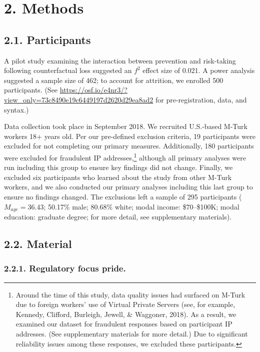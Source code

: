 \documentclass[man,floatsintext]{apa6}
\let\rmarkdownfootnote\footnote%
\def\footnote{\protect\rmarkdownfootnote}
\begin{document}
\hypertarget{methods}{%
\section{2. Methods}\label{methods}}

\hypertarget{participants}{%
\subsection{2.1. Participants}\label{participants}}

A pilot study examining the interaction between prevention and risk-taking following counterfactual loss suggested an \(f^2\) effect size of 0.021. A power analysis suggested a sample size of 462; to account for attrition, we enrolled 500 participants. (See \url{https://osf.io/e4nr3/?view_only=73c8490e19c6449197d2620d29ea8ad2} for pre-registration, data, and syntax.)

Data collection took place in September 2018. We recruited U.S.-based M-Turk workers 18+ years old. Per our pre-defined exclusion criteria, 19 participants were excluded for not completing our primary measures. Additionally, 180 participants were excluded for fraudulent IP addresses,\footnote{Around the time of this study, data quality issues had surfaced on M-Turk due to foreign workers' use of Virtual Private Servers (see, for example, Kennedy, Clifford, Burleigh, Jewell, \& Waggoner, 2018). As a result, we examined our dataset for fraudulent responses based on participant IP addresses. (See supplementary materials for more detail.) Due to significant reliability issues among these responses, we excluded these participants.} although all primary analyses were run including this group to ensure key findings did not change. Finally, we excluded six participants who learned about the study from other M-Turk workers, and we also conducted our primary analyses including this last group to ensure no findings changed. The exclusions left a sample of 295 participants (\(M_{age}=36.43\); 50.17\% male; 80.68\% white; modal income: \$70--\$100K; modal education: graduate degree; for more detail, see supplementary materials).

\hypertarget{material}{%
\subsection{2.2. Material}\label{material}}

\hypertarget{regulatory-focus-pride.}{%
\subsubsection{2.2.1. Regulatory focus pride.}\label{regulatory-focus-pride.}}
\end{document}

